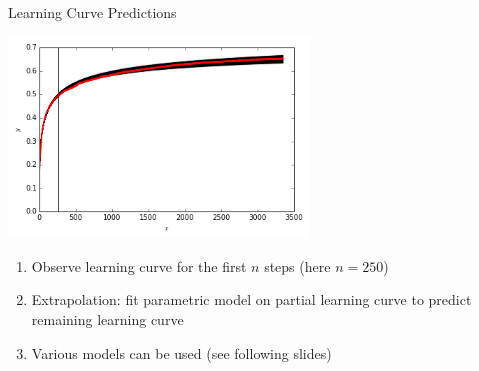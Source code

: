 \begin{frame}[c,fragile]{Learning Curve Predictions}

\centering
\includegraphics[width=0.6\textwidth]{images/learning_curve_single_pred}

\begin{enumerate}
  \item Observe learning curve for the first $n$ steps (here $n=250$)
  \pause
  \item \alert{Extrapolation}: fit parametric model on partial learning curve to predict remaining learning curve
  \pause
  \item Various models can be used (see following slides)
  
\end{enumerate}

\end{frame}

